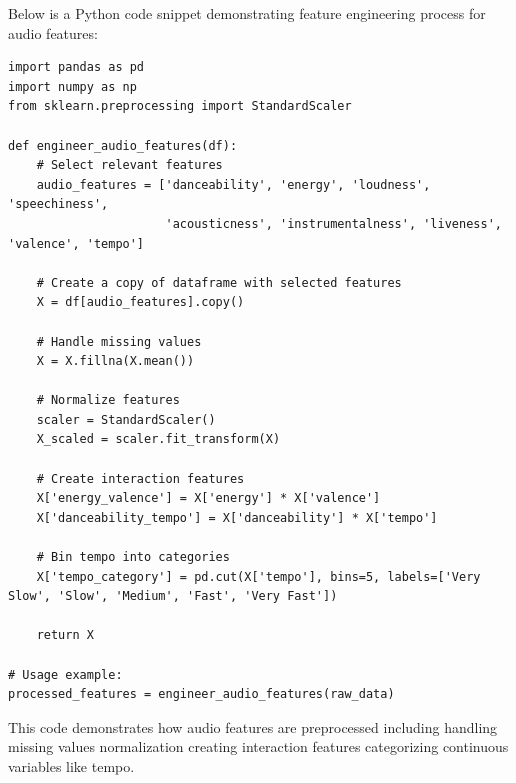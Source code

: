 \documentclass[runningheads]{llncs}
\begin{document}
Below is a Python code snippet demonstrating feature engineering process for audio features:

\begin{verbatim}
import pandas as pd
import numpy as np
from sklearn.preprocessing import StandardScaler

def engineer_audio_features(df):
    # Select relevant features
    audio_features = ['danceability', 'energy', 'loudness', 'speechiness', 
                      'acousticness', 'instrumentalness', 'liveness', 'valence', 'tempo']
    
    # Create a copy of dataframe with selected features
    X = df[audio_features].copy()
    
    # Handle missing values
    X = X.fillna(X.mean())
    
    # Normalize features
    scaler = StandardScaler()
    X_scaled = scaler.fit_transform(X)
    
    # Create interaction features
    X['energy_valence'] = X['energy'] * X['valence']
    X['danceability_tempo'] = X['danceability'] * X['tempo']
    
    # Bin tempo into categories
    X['tempo_category'] = pd.cut(X['tempo'], bins=5, labels=['Very Slow', 'Slow', 'Medium', 'Fast', 'Very Fast'])
    
    return X

# Usage example:
processed_features = engineer_audio_features(raw_data)
\end{verbatim}

This code demonstrates how audio features are preprocessed including handling missing values normalization creating interaction features categorizing continuous variables like tempo.
\end{document}
